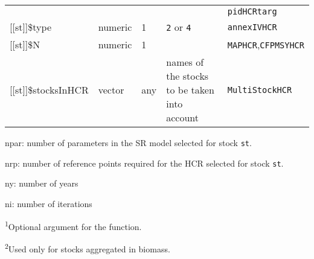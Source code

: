 \begin{landscape}
\begin{table}[!ht]
\begin{footnotesize}
\begin{threeparttable}
\begin{tabular}{lllll}
         &  &  &  & \texttt{pidHCRtarg} \\
        {[[st]]}\$type & numeric & 1 & \texttt{2} or \texttt{4} & \texttt{annexIVHCR}  \\
        {[[st]]}\$N & numeric & 1 &  & \texttt{MAPHCR},\texttt{CFPMSYHCR} \\
        {[[st]]}\$stocksInHCR & vector & any &  names of the stocks to be taken into account & \texttt{MultiStockHCR}  \\
        \hline
      \end{tabular}

      \begin{tablenotes}
        \item npar: number of parameters in the SR model selected for stock \texttt{st}.
        \item nrp: number of reference points required for the HCR selected for stock \texttt{st}.
        \item ny: number of years
        \item ni: number of iterations
        \item \textsuperscript{1}Optional argument for the function.
        \item \textsuperscript{2}Used only for stocks aggregated in biomass.
      \end{tablenotes}

    \end{threeparttable}
  \end{footnotesize}

\end{table}        



\end{landscape}


